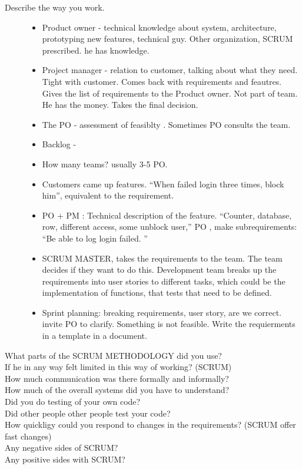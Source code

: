 \documentclass{article}
\begin{document}
\begin{description}
\item[Describe the way you work.]
  \begin{itemize}
  \item Product owner - technical knowledge about system,
    architecture, prototyping new features, technical guy. Other
    organization, SCRUM prescribed. he has knowledge.
  \item Project manager - relation to customer, talking about what they
    need. Tight with customer. Comes back with requirements and
    feautres. Gives the list of requirements to the Product
    owner. Not part of team. He has the money. Takes the final
    decision.
  \item The PO - assessment of feasiblty . Sometimes PO consults the
    team.
  \item Backlog -
  \item How many teams? usually 3-5 PO.
  \item Customers came up features. ``When failed login three times,
    block him'', equivalent to the requirement.
  \item PO + PM : Technical description of the feature. ``Counter,
    database, row, different access, some unblock user,'' PO , make
    subrequirements: ``Be able to log login failed. ''

  \item SCRUM MASTER, takes the requirements to the team. The team
    decides if they want to do this. Development team breaks up the
    requirements into user stories to different tasks, which could be
    the implementation of functions, that tests that need to be
    defined.
  \item Sprint planning: breaking requirements, user story, are we
    correct. invite PO to clarify. Something is not feasible. Write
    the requierments in a template in a document.

  \end{itemize}
\item[What parts of the SCRUM METHODOLOGY did you use?]
\item[If he in any way felt limited in this way of working? (SCRUM)]
\item[How much communication was there formally and informally?]
\item[How much of the overall systems did you have to understand?]
\item[Did you do testing of your own code?]
\item[Did other people other people test your code?]
\item[How quickligy could you respond to changes in the requirements?
  (SCRUM offer fast changes)]
\item[Any negative sides of SCRUM?]
\item[Any positive sides with SCRUM?]


\end{description}
\end{document}
